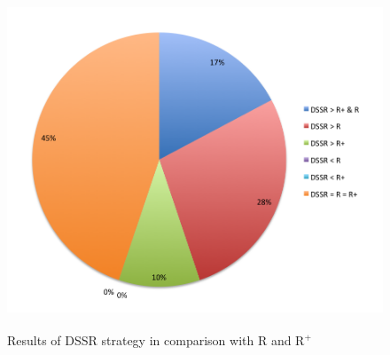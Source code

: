 \bigskip
\begin{figure}[h]
\centering
\includegraphics[width=12cm,height=10cm]{chapter4/pie4.png}
\bigskip
\caption{Results of DSSR strategy in comparison with R and R$^+$}
\label{fig:resultsOfDSSRPie}
\end{figure}



